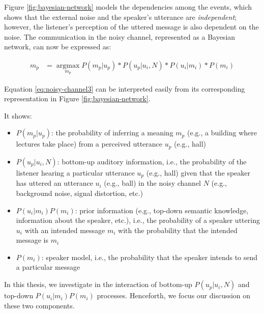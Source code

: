 \documentclass[a4paper, nobind]{templates/ociamthesis}
\providecommand{\tightlist}{%
  \setlength{\itemsep}{0pt}\setlength{\parskip}{0pt}}
\begin{document}
Figure \ref{fig:bayesian-network} models the dependencies among the events,
which shows that the external noise and the speaker's utterance are \emph{independent};
however, the listener's perception of the uttered message is also dependent on the noise.
The communication in the noisy channel, represented as a Bayesian network, can now be expressed as:

\begin{align} \label{eq:noisy-channel3}
\hat{m_p} &= \mathop{\mathrm{argmax}}\limits_{m_p} P(m_p | u_p) * P(u_p|u_i, N) * P(u_i | m_i) * P(m_i)
\end{align}

Equation \eqref{eq:noisy-channel3} can be interpreted easily from its corresponding representation in Figure \ref{fig:bayesian-network}.

It shows:

\begin{itemize}
\tightlist
\item
  \(P(m_p | u_p)\): the probability of inferring a meaning \(m_p\) (e.g., a building where lectures take place) from a perceived utterance \(u_p\) (e.g., hall)
\item
  \(P(u_p|u_i, N)\): bottom-up auditory information, i.e., the probability of the listener hearing a particular utterance \(u_p\) (e.g., hall) given that the speaker has uttered an utterance \(u_i\) (e.g., ball) in the noisy channel \(N\) (e.g., background noise, signal distortion, etc.)
\item
  \(P(u_i|m_i)P(m_i)\): prior information (e.g., top-down semantic knowledge, information about the speaker, etc.), i.e., the probability of a speaker uttering \(u_i\) with an intended message \(m_i\) with the probability that the intended message is \(m_i\)
\item
  \(P(m_i)\): speaker model, i.e., the probability that the speaker intends to send a particular message
\end{itemize}

In this thesis, we investigate in the interaction of bottom-up \(P(u_p|u_i, N)\) and top-down \(P(u_i|m_i)P(m_i)\) processes.
Henceforth, we focus our discussion on these two components.
\end{document}
